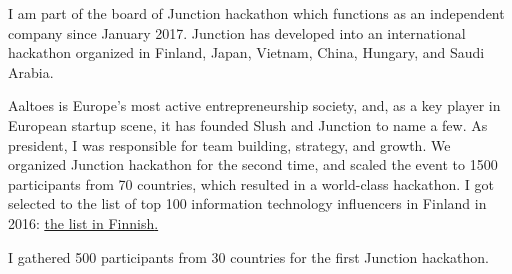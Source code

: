 \documentclass[]{deedy-resume}
\begin{document}
\begin{minipage}[t]{0.66\textwidth}
% 


I am part of the board of Junction hackathon which functions as an independent company since January 2017. Junction has developed into an international hackathon organized in Finland, Japan, Vietnam, China, Hungary, and Saudi Arabia.
\sectionsep

Aaltoes is Europe's most active entrepreneurship society, and, as a key player in European startup scene, it has founded Slush and Junction to name a few.
As president, I was responsible for team building, strategy, and growth. We organized Junction hackathon for the second time, and scaled the event to 1500 participants from 70 countries, which resulted in a world-class hackathon. I got selected to the list of top 100 information technology influencers in Finland in 2016: \href{https://www.tivi.fi/Kaikki_uutiset/tassa-ovat-it-alan-100-vaikuttajaa-2016-6604873}{\underline{the list in Finnish}.}
\sectionsep

I gathered 500 participants from 30 countries for the first Junction hackathon.
\sectionsep


\end{minipage}
\end{document}
